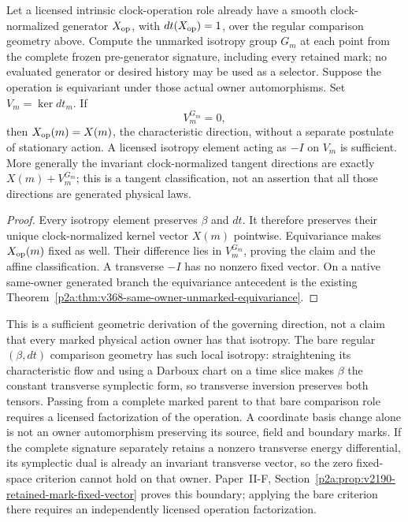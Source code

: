 \documentclass[12pt,a4paper]{article}
\begin{document}
\begin{theorem}
\label{p2a:thm:v2190-clock-isotropy-rigidity}
Let a licensed intrinsic clock-operation role already have a smooth
clock-normalized generator \(X_{\rm op}\), with
\(dt(X_{\rm op})=1\), over the regular comparison geometry above.  Compute
the unmarked isotropy group \(G_m\) at each point from the complete frozen
pre-generator signature, including every retained mark; no evaluated
generator or desired history may be used as a selector.  Suppose the
operation is equivariant under those actual owner automorphisms.  Set
\(V_m=\ker dt_m\).  If
\[
 \boxed{V_m^{G_m}=0,}
\]
then \(X_{\rm op}(m)=X(m)\), the characteristic direction, without a
separate postulate of stationary action.  A licensed isotropy element
acting as \(-I\) on \(V_m\) is sufficient.  More generally the invariant
clock-normalized tangent directions are exactly
\(X(m)+V_m^{G_m}\); this is a tangent classification, not an assertion
that all those directions are generated physical laws.
\end{theorem}
\begin{proof}
Every isotropy element preserves \(\beta\) and \(dt\).  It therefore
preserves their unique clock-normalized kernel vector \(X(m)\) pointwise.
Equivariance makes \(X_{\rm op}(m)\) fixed as well.  Their difference lies
in \(V_m^{G_m}\), proving the claim and the affine classification.
A transverse \(-I\) has no nonzero fixed vector.  On a native same-owner
generated branch the equivariance antecedent is the existing
Theorem~\ref{p2a:thm:v368-same-owner-unmarked-equivariance}.
\end{proof}

This is a sufficient geometric derivation of the governing direction,
not a claim that every marked physical action owner has that isotropy.
The bare regular \((\beta,dt)\) comparison geometry has such local
isotropy: straightening its characteristic flow and using a Darboux chart
on a time slice makes \(\beta\) the constant transverse symplectic form,
so transverse inversion preserves both tensors.  Passing from a complete
marked parent to that bare comparison role requires a licensed
factorization of the operation.  A coordinate basis change alone is not
an owner automorphism preserving its source, field and boundary marks.
If the complete signature separately retains a nonzero transverse energy
differential, its symplectic dual is already an invariant transverse
vector, so the zero fixed-space criterion cannot hold on that owner.
Paper~II-F, Section~\ref{p2a:prop:v2190-retained-mark-fixed-vector} proves this
boundary; applying the bare criterion there requires an independently
licensed operation factorization.
\end{document}
